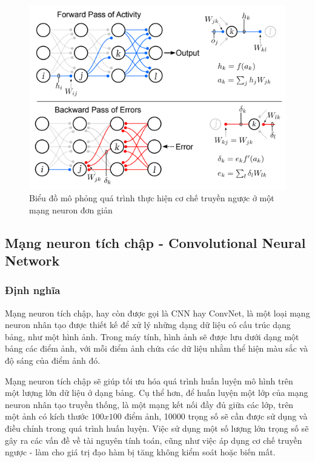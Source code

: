 \begin{figure}[H]
  \centering
  \includegraphics{pics/Chapter3/backprop.png}
  \caption{Biểu đồ mô phỏng quá trình thực hiện cơ chế truyền ngược ở một mạng neuron đơn giản \cite{lillicrap2020backpropagation}}
  \label{fig:enter-label}
\end{figure}

\subsection{Mạng neuron tích chập - Convolutional Neural Network}
\subsubsection*{Định nghĩa}
Mạng neuron tích chập, hay còn được gọi là CNN hay ConvNet, là một loại mạng neuron nhân tạo được thiết kế để xử lý những dạng dữ liệu có cấu trúc dạng bảng, như một hình ảnh. Trong máy tính, hình ảnh sẽ được lưu dưới dạng một bảng các điểm ảnh, với mỗi điểm ảnh chứa các dữ liệu nhằm thể hiện màu sắc và độ sáng của điểm ảnh đó.


Mạng neuron tích chập sẽ giúp tối ưu hóa quá trình huấn luyện mô hình trên một lượng lớn dữ liệu ở dạng bảng. Cụ thể hơn, để huấn luyện một lớp của mạng neuron nhân tạo truyền thống, là một mạng kết nối đầy đủ giữa các lớp, trên một ảnh có kích thước $100x100$ điểm ảnh, 10000 trọng số sẽ cần được sử dụng và điều chỉnh trong quá trình huấn luyện. Việc sử dụng một số lượng lớn trọng số sẽ gây ra các vấn đề về tài nguyên tính toán, cũng như việc áp dụng cơ chế truyền ngược - làm cho giá trị đạo hàm bị tăng không kiểm soát hoặc biến mất.

